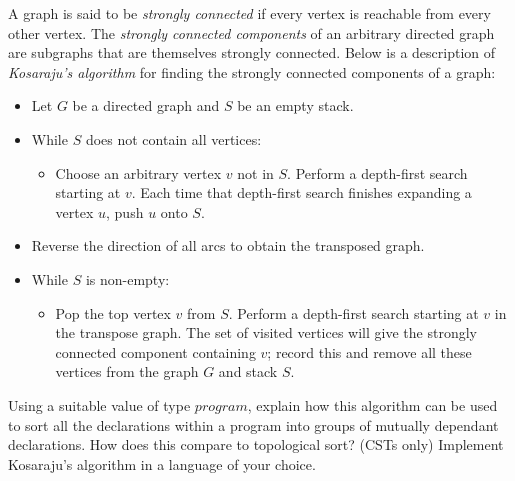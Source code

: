 \documentclass[10pt,a4paper]{exam}
\begin{document}
\begin{questions}
\question[10] A graph is said to be \emph{strongly connected} if every vertex is reachable from every other vertex. The \emph{strongly connected components} of an arbitrary directed graph are subgraphs that are themselves strongly connected. Below is a description of \emph{Kosaraju's algorithm} for finding the strongly connected components of a graph:
\begin{itemize}
\item Let $G$ be a directed graph and $S$ be an empty stack.
\item While $S$ does not contain all vertices:
\begin{itemize}
\item Choose an arbitrary vertex $v$ not in $S$. Perform a depth-first search starting at $v$. Each time that depth-first search finishes expanding a vertex $u$, push $u$ onto $S$.
\end{itemize}
\item Reverse the direction of all arcs to obtain the transposed graph.
\item While $S$ is non-empty:
\begin{itemize}
\item Pop the top vertex $v$ from $S$. Perform a depth-first search starting at $v$ in the transpose graph. The set of visited vertices will give the strongly connected component containing $v$; record this and remove all these vertices from the graph $G$ and stack $S$. 
\end{itemize}
\end{itemize}
Using a suitable value of type $\mathit{program}$, explain how this algorithm can be used to sort all the declarations within a program into groups of mutually dependant declarations. How does this compare to topological sort? \droppoints 
\question[10] (CSTs only) Implement Kosaraju's algorithm in a language of your choice. \droppoints 

\end{questions}
\end{document}
